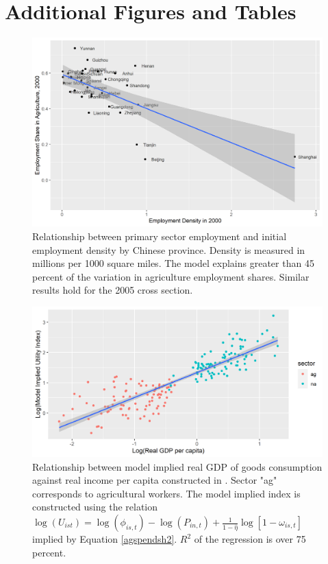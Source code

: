 \documentclass[]{article}
\theoremstyle{plain}
\begin{document}
\paragraph*{}

\newpage

\section{Additional Figures and Tables} \label{appendix:figures}

	\begin{figure}[h]
		\includegraphics[width=\textwidth]{fig1.png}
		\caption{Relationship between primary sector employment and initial employment density by Chinese province. Density is measured in millions per 1000 square miles. The model explains greater than 45 percent of the variation in agriculture employment shares. Similar results hold for the 2005 cross section.}
		\label{fig:emp_share_dens}
	\end{figure}
\newpage
\begin{figure}[h]
	\includegraphics[width=\textwidth]{model_implied_index.png}
	\caption{Relationship between model implied real GDP of goods consumption against real income per capita constructed in \cite{tombezhu}. Sector "ag" corresponds to agricultural workers. The model implied index is constructed using the relation $\log(U_{ist}) = \log(\phi_{is, t}) - \log(P_{in, t}) + \frac{1}{1-\hat{\eta}}\log[1-\omega_{is,t}]$ implied by Equation \eqref{agspendsh2}. $R^{2}$ of the regression is over 75 percent. }   
	\label{fig:model_implied_index}
\end{figure}
\end{document}
